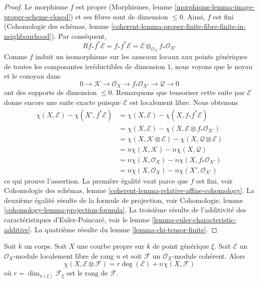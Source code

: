 \begin{proof}
Le morphisme $f$ est propre
(Morphismes, lemme \ref{morphisms-lemma-image-proper-scheme-closed})
et ses fibres sont de dimension $\leq 0$. Ainsi, $f$ est fini
(Cohomologie des schémas, lemme
\ref{coherent-lemma-proper-finite-fibre-finite-in-neighbourhood}).
Par conséquent,
$$
Rf_*f^*\mathcal{E} = f_*f^*\mathcal{E} =
\mathcal{E} \otimes_{\mathcal{O}_X} f_*\mathcal{O}_{X'}
$$
Comme $f$ induit un isomorphisme sur les anneaux locaux aux points génériques de
toutes les composantes irréductibles de dimension $1$, nous voyons que le noyau
et le conoyau dans
$$
0 \to \mathcal{K} \to \mathcal{O}_X \to f_*\mathcal{O}_{X'}
\to \mathcal{Q} \to 0
$$
ont des supports de dimension $\leq 0$. Remarquons que tensoriser cette suite par
$\mathcal{E}$ donne encore une suite exacte puisque $\mathcal{E}$ est localement libre.
Nous obtenons
\begin{align*}
\chi(X, \mathcal{E}) - \chi(X', f^*\mathcal{E})
& =
\chi(X, \mathcal{E}) - \chi(X, f_*f^*\mathcal{E}) \\
& =
\chi(X, \mathcal{E}) - \chi(X, \mathcal{E} \otimes f_*\mathcal{O}_{X'}) \\
& =
\chi(X, \mathcal{K} \otimes \mathcal{E}) -
\chi(X, \mathcal{Q} \otimes \mathcal{E}) \\
& =
n\chi(X, \mathcal{K}) -
n\chi(X, \mathcal{Q}) \\
& =
n\chi(X, \mathcal{O}_X) - n\chi(X, f_*\mathcal{O}_{X'}) \\
& =
n\chi(X, \mathcal{O}_X) - n\chi(X', \mathcal{O}_{X'})
\end{align*}
ce qui prouve l'assertion. La première égalité vaut parce que $f$ est fini, voir
Cohomologie des schémas, lemme \ref{coherent-lemma-relative-affine-cohomology}.
La deuxième égalité résulte de la formule de projection, voir
Cohomologie, lemme \ref{cohomology-lemma-projection-formula}.
La troisième résulte de l'additivité des caractéristiques d'Euler-Poincaré, voir
le lemme \ref{lemma-euler-characteristic-additive}.
La quatrième résulte du lemme \ref{lemma-chi-tensor-finite}.
\end{proof}

\begin{lemma}
\label{lemma-degree-on-proper-curve}
Soit $k$ un corps. Soit $X$ une courbe propre sur $k$ de point générique
$\xi$. Soit $\mathcal{E}$ un $\mathcal{O}_X$-module localement libre de rang $n$
et soit $\mathcal{F}$ un $\mathcal{O}_X$-module cohérent. Alors
$$
\chi(X, \mathcal{E} \otimes \mathcal{F}) =
r \deg(\mathcal{E}) + n \chi(X, \mathcal{F})
$$
où $r = \dim_{\kappa(\xi)} \mathcal{F}_\xi$ est le rang de $\mathcal{F}$.
\end{lemma}

